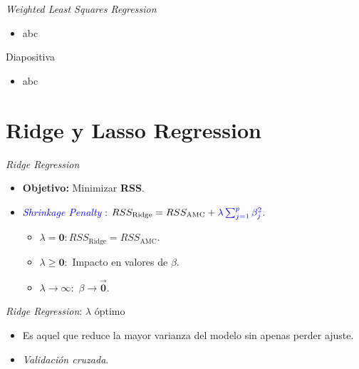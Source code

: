 \documentclass[11pt]{beamer}
\newcommand{\B}{\beta}
\begin{document}
\begin{frame}{\textit{Weighted Least Squares Regression}}
	\begin{itemize}
		\item abc
	\end{itemize}
\end{frame}

\begin{frame}{Diapositiva}
	\begin{itemize}
		\item abc
	\end{itemize}
\end{frame}




\section{Ridge y Lasso Regression}

\begin{frame}{\textit{Ridge Regression}}
	\begin{itemize}
		\item \textbf{Objetivo:} Minimizar \textbf{RSS}.
		\pause
		\item \textcolor{blue}{\textit{Shrinkage Penalty}} : $RSS_{\text{Ridge}} = RSS_{\text{AMC}} + \textcolor{blue}{\lambda \sum^p_{j=1} \beta_j^2}$.
		\begin{itemize}
			\item $\lambda = \mathbf{0}: RSS_{\text{Ridge}} = RSS_{\text{AMC}}$.
			\item $\lambda \geq \mathbf{0}:$ Impacto en valores de $\B$.
			\item $\lambda \to \mathbf{\infty}:$ $\B \to \vec{\mathbf{0}}$.
		\end{itemize}
	\end{itemize}
\end{frame}

\begin{frame}{\textit{Ridge Regression}: $\lambda$ óptimo}
	\begin{itemize}
		\item Es aquel que reduce la mayor varianza del modelo sin apenas perder ajuste.
		\pause
		\item \textit{Validación cruzada}.
	\end{itemize}
\end{frame}
\end{document}
